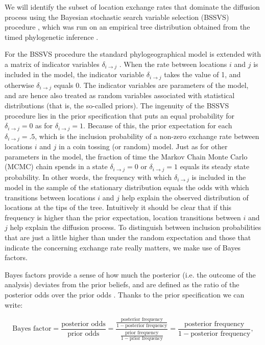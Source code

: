 \documentclass[english]{paper}
\begin{document}
We will identify the subset of location exchange rates that dominate the diffusion process using the Bayesian stochastic search variable selection (BSSVS) procedure \citep{lemey:2009fk}, which was run on an empirical tree distribution obtained from the timed phylogenetic inference \citep{Lemey:2014aa}. 
\par
For the BSSVS procedure the standard phylogeographical model is extended with a matrix of indicator variables $\delta_{i{\rightarrow}j}$ \citep{lemey:2009fk}.
When the rate between locations $i$ and $j$ is included in the model, the indicator variable $\delta_{i{\rightarrow}j}$ takes the value of 1, and otherwise $\delta_{i{\rightarrow}j}$ equals 0.
The indicator variables are parameters of the model, and are hence also treated as random variables associated with statistical distributions (that is, the so-called priors).
The ingenuity of the BSSVS procedure lies in the prior specification that puts an equal probability for $\delta_{i{\rightarrow}j} = 0$ as for $\delta_{i{\rightarrow}j} = 1$. 
Because of this, the prior expectation for each $\delta_{i{\rightarrow}j} = .5$, which is the inclusion probability of a non-zero exchange rate between locations $i$ and $j$ in a coin tossing (or random) model.
Just as for other parameters in the model, the fraction of time the Markov Chain Monte Carlo (MCMC) chain spends in a state $\delta_{i{\rightarrow}j} = 0$ or $\delta_{i{\rightarrow}j} = 1$ equals its steady state probability.
In other words, the frequency with which $\delta_{i{\rightarrow}j}$ is included in the model in the sample of the stationary distribution equals the odds with which transitions between locations $i$ and $j$ help explain the observed distribution of locations at the tips of the tree.
Intuitively it should be clear that if this frequency is higher than the prior expectation, location transitions between $i$ and $j$ help explain the diffusion process. 
To distinguish between inclusion probabilities that are just a little higher than under the random expectation and those that indicate the  concerning exchange rate really matters, we make use of Bayes factors.
\par
Bayes factors provide a sense of how much the posterior (i.e. the outcome of the analysis) deviates from the prior beliefs, and are defined as the ratio of the posterior odds over the prior odds \citep{kass:1995a}.
Thanks to the prior specification we can write:

$$ \text{Bayes factor} = \frac{ \text{posterior odds}}{\text{prior odds}} = \frac{\frac{\text{posterior frequency}}{1 - \text{posterior frequency}}}{\frac{\text{prior frequency}}{1 - \text{prior frequency}}} = \frac{\text{posterior frequency}}{1 - \text{posterior frequency}},$$
\end{document}
